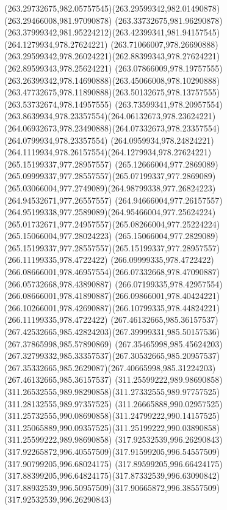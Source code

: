 {    \curveto(263.29732675,982.05757545)(263.29599342,982.01490878)(263.29466008,981.97090878)
    \curveto(263.33732675,981.96290878)(263.37999342,981.95224212)(263.42399341,981.94157545)
    \moveto(264.1279934,978.27624221)
    \curveto(263.71066007,978.26690888)(263.29599342,978.26024221)(262.88399343,978.27624221)
    \lineto(262.89599343,978.25624221)
    \curveto(263.07866009,978.19757555)(263.26399342,978.14690888)(263.45066008,978.10290888)
    \curveto(263.47732675,978.11890888)(263.50132675,978.13757555)(263.53732674,978.14957555)
    \curveto(263.73599341,978.20957554)(263.8639934,978.23357554)(264.06132673,978.23624221)
    \curveto(264.06932673,978.23490888)(264.07332673,978.23357554)(264.0799934,978.23357554)
    \curveto(264.0959934,978.24824221)(264.1119934,978.26157554)(264.1279934,978.27624221)
    \moveto(265.15199337,977.28957557)
    \curveto(265.12666004,977.2869089)(265.09999337,977.28557557)(265.07199337,977.2869089)
    \curveto(265.03066004,977.2749089)(264.98799338,977.26824223)(264.94532671,977.26557557)
    \curveto(264.94666004,977.26157557)(264.95199338,977.2589089)(264.95466004,977.25624224)
    \curveto(265.01732671,977.24957557)(265.08266004,977.25224224)(265.15066004,977.28024223)
    \curveto(265.15066004,977.2829089)(265.15199337,977.28557557)(265.15199337,977.28957557)
    \moveto(266.11199335,978.4722422)
    \curveto(266.09999335,978.4722422)(266.08666001,978.46957554)(266.07332668,978.47090887)
    \lineto(266.05732668,978.43890887)
    \curveto(266.07199335,978.42957554)(266.08666001,978.41890887)(266.09866001,978.40424221)
    \curveto(266.10266001,978.42690887)(266.10799335,978.44824221)(266.11199335,978.4722422)
    \moveto(267.46132665,985.36157537)
    \curveto(267.42532665,985.42824203)(267.39999331,985.50157536)(267.37865998,985.57890869)
    \curveto(267.35465998,985.45624203)(267.32799332,985.33357537)(267.30532665,985.20957537)
    \curveto(267.35332665,985.2629087)(267.40665998,985.31224203)(267.46132665,985.36157537)
    \moveto(311.25599222,989.98690858)
    \curveto(311.26532555,989.98290858)(311.27332555,989.97757525)(311.28132555,989.97357525)
    \curveto(311.26665888,990.02957525)(311.25732555,990.08690858)(311.24799222,990.14157525)
    \curveto(311.25065889,990.09357525)(311.25199222,990.03890858)(311.25599222,989.98690858)
    \moveto(317.92532539,996.26290843)
    \curveto(317.92265872,996.40557509)(317.91599205,996.54557509)(317.90799205,996.68024175)
    \curveto(317.89599205,996.66424175)(317.88399205,996.64824175)(317.87332539,996.63090842)
    \curveto(317.88932539,996.50957509)(317.90665872,996.38557509)(317.92532539,996.26290843)
}
